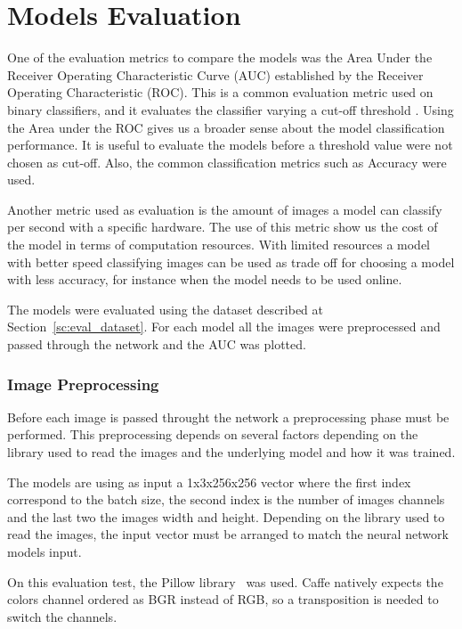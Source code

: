 \section{Models Evaluation}

One of the evaluation metrics to compare the models was the Area Under the Receiver Operating Characteristic Curve (AUC) established by the Receiver Operating Characteristic  (ROC). This is a common evaluation metric used on binary classifiers, and it evaluates the classifier varying a cut-off threshold \cite{Ling2003}. Using the Area under the ROC gives us a broader sense about the model classification performance. It is useful to evaluate the models before a threshold value were not chosen as cut-off. Also, the common classification metrics such as Accuracy were used. 

Another metric used as evaluation is the amount of images a model can classify per second with a specific hardware. 
The use of this metric show us the cost of the model in terms of computation resources. With limited resources a model with better speed classifying images can be used as trade off for choosing a model with less accuracy, for instance when the model needs to be used online. 

The models were evaluated using the dataset described at Section~\ref{sc:eval_dataset}. For each model all the images were preprocessed and passed through the network and the AUC was plotted.

\subsubsection{Image Preprocessing}

Before each image is passed throught the network a preprocessing phase must be performed. This preprocessing depends on several factors depending on the library used to read the images and the underlying model and how it was trained.

The models are using as input a 1x3x256x256 vector where the first index correspond to the batch size, the second index is the number of images channels and the last two the images width and height. Depending on the library used to read the images, the input vector must be arranged to match the neural network models input.

On this evaluation test, the Pillow library~\cite{wiredfool_2016_44297} was used. Caffe natively expects the colors channel ordered as BGR instead of RGB, so a transposition is needed to switch the channels.

